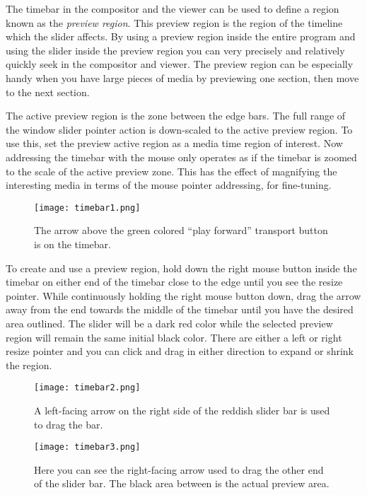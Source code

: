 The timebar in the compositor and the viewer can be used to define a region known as the \textit{preview region}.  
This preview region is the region of the timeline which the slider affects.  
By using a preview region inside the entire program and using the slider inside the preview region you can very precisely and relatively quickly seek in the compositor and viewer.  
The preview region can be especially handy when you have large pieces of media by previewing one section, then move to the next section.  

The active preview region is the zone between the edge bars.  
The full range of the window slider pointer action is down-scaled to the active preview region.   
To use this, set the preview active region as a media time region of interest.  
Now addressing the timebar with the mouse only operates as if the timebar is zoomed to the scale of the active preview zone.  
This has the effect of magnifying the interesting media in terms of the mouse pointer addressing, for fine-tuning.

\begin{figure}[htpb]
    \centering
    \texttt{[image: timebar1.png]}
    \caption{The arrow above the green colored “play forward” transport button is on the timebar.}
    \label{fig:timebar1}
\end{figure}

To create and use a preview region, hold down the right mouse button inside the timebar on either end of the timebar close to the edge until you see the resize pointer.  
While continuously holding the right mouse button down, drag the arrow away from the end towards the middle of the timebar until you have the desired area outlined.  
The slider will be a dark red color while the selected preview region will remain the same initial black color.  
There are either a left or right resize pointer and you can click and drag in either direction to expand or shrink the region.

\begin{figure}[htpb]
    \centering
    \texttt{[image: timebar2.png]}
    \caption{A left-facing arrow on the right side of the reddish slider bar is used to drag the bar.}
    \label{fig:timebar2}
\end{figure}

\begin{figure}[htpb]
    \centering
    \texttt{[image: timebar3.png]}
    \caption{Here you can see the right-facing arrow used to drag the other end of the slider bar.  
        The black area between is the actual preview area.}
    \label{fig:timebar3}
\end{figure}

